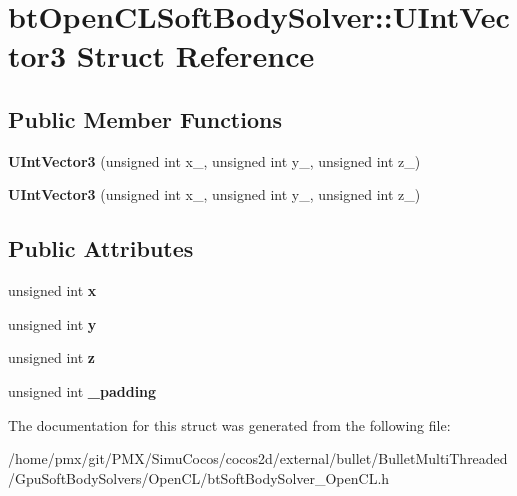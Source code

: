 \hypertarget{structbtOpenCLSoftBodySolver_1_1UIntVector3}{}\section{bt\+Open\+C\+L\+Soft\+Body\+Solver\+:\+:U\+Int\+Vector3 Struct Reference}
\label{structbtOpenCLSoftBodySolver_1_1UIntVector3}
\subsection*{Public Member Functions}
\begin{DoxyCompactItemize}
\item 
\mbox{\label{structbtOpenCLSoftBodySolver_1_1UIntVector3_a2008c03a63b7746bba70a12417077604}} 
{\bfseries U\+Int\+Vector3} (unsigned int x\+\_\+, unsigned int y\+\_\+, unsigned int z\+\_\+)
\item 
\mbox{\label{structbtOpenCLSoftBodySolver_1_1UIntVector3_a2008c03a63b7746bba70a12417077604}} 
{\bfseries U\+Int\+Vector3} (unsigned int x\+\_\+, unsigned int y\+\_\+, unsigned int z\+\_\+)
\end{DoxyCompactItemize}
\subsection*{Public Attributes}
\begin{DoxyCompactItemize}
\item 
\mbox{\label{structbtOpenCLSoftBodySolver_1_1UIntVector3_aca2e64702a55e0f6f251293a2e4de1ee}} 
unsigned int {\bfseries x}
\item 
\mbox{\label{structbtOpenCLSoftBodySolver_1_1UIntVector3_a3416fbf8db1e56e6ec0598d97b106991}} 
unsigned int {\bfseries y}
\item 
\mbox{\label{structbtOpenCLSoftBodySolver_1_1UIntVector3_a832e9c3c268d64c6ba248011d7508bec}} 
unsigned int {\bfseries z}
\item 
\mbox{\label{structbtOpenCLSoftBodySolver_1_1UIntVector3_a20943a6bb3fcc12d0dc89551389db7c3}} 
unsigned int {\bfseries \+\_\+padding}
\end{DoxyCompactItemize}


The documentation for this struct was generated from the following file\+:\begin{DoxyCompactItemize}
\item 
/home/pmx/git/\+P\+M\+X/\+Simu\+Cocos/cocos2d/external/bullet/\+Bullet\+Multi\+Threaded/\+Gpu\+Soft\+Body\+Solvers/\+Open\+C\+L/bt\+Soft\+Body\+Solver\+\_\+\+Open\+C\+L.\+h\end{DoxyCompactItemize}
